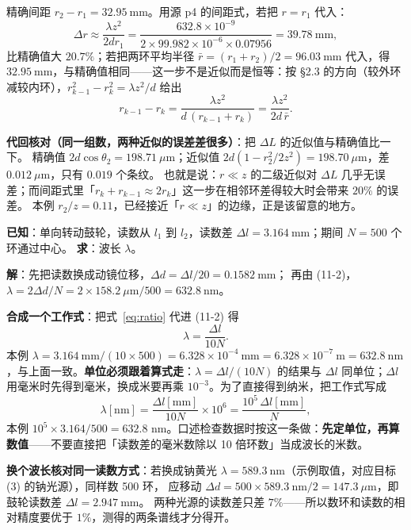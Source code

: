 \documentclass[11pt]{ctexart}
\newcommand{\Dl}{d}
\begin{document}
精确间距 $r_2-r_1=32.95\ \mathrm{mm}$。用源 p4 的间距式，若把 $r=r_1$ 代入：
\[
  \Delta r\approx\frac{\lambda z^2}{2\Dl r_1}=\frac{632.8\times10^{-9}}{2\times99.982\times10^{-6}\times0.07956}=39.78\ \mathrm{mm},
\]
比精确值大 $20.7\%$；若把两环平均半径 $\bar r=(r_1+r_2)/2=96.03\ \mathrm{mm}$ 代入，得 $32.95\ \mathrm{mm}$，与精确值相同——这一步不是近似而是恒等：按 §2.3 的方向（较外环减较内环），$r_{k-1}^2-r_k^2=\lambda z^2/\Dl$ 给出
\[
  r_{k-1}-r_k=\frac{\lambda z^2}{\Dl\,(r_{k-1}+r_k)}=\frac{\lambda z^2}{2\Dl\,\bar r}.
\]

\textbf{代回核对（同一组数，两种近似的误差差很多）}：把 $\Delta L$ 的近似值与精确值比一下。
精确值 $2\Dl\cos\theta_2=198.71\ \mu\mathrm{m}$；近似值 $2\Dl(1-r_2^2/2z^2)=198.70\ \mu\mathrm{m}$，差 $0.012\ \mu\mathrm{m}$，只有 $0.019$ 个条纹。
也就是说：$r\ll z$ 的二级近似对 $\Delta L$ 几乎无误差；而间距式里「$r_k+r_{k-1}\approx2r_k$」这一步在相邻环差得较大时会带来 $20\%$ 的误差。
本例 $r_2/z=0.11$，已经接近「$r\ll z$」的边缘，正是该留意的地方。


\textbf{已知}：单向转动鼓轮，读数从 $l_1$ 到 $l_2$，读数差 $\Delta l=3.164\ \mathrm{mm}$；期间 $N=500$ 个环通过中心。
\textbf{求}：波长 $\lambda$。

\textbf{解}：先把读数换成动镜位移，$\Delta\Dl=\Delta l/20=0.1582\ \mathrm{mm}$；
再由 (11-2)，$\lambda=2\Delta\Dl/N=2\times158.2\ \mu\mathrm{m}/500=632.8\ \mathrm{nm}$。

\textbf{合成一个工作式}：把式~\eqref{eq:ratio} 代进 (11-2) 得
\[
  \lambda=\frac{\Delta l}{10N}.
\]
本例 $\lambda=3.164\ \mathrm{mm}/(10\times500)=6.328\times10^{-4}\ \mathrm{mm}=6.328\times10^{-7}\ \mathrm{m}=632.8\ \mathrm{nm}$，与上面一致。\textbf{单位必须跟着算式走}：$\lambda=\Delta l/(10N)$ 的结果与 $\Delta l$ 同单位；$\Delta l$ 用毫米时先得到毫米，换成米要再乘 $10^{-3}$。为了直接得到纳米，把工作式写成
\[
  \lambda[\mathrm{nm}]=\frac{\Delta l[\mathrm{mm}]}{10N}\times10^{6}
  =\frac{10^{5}\,\Delta l[\mathrm{mm}]}{N},
\]
本例 $10^{5}\times3.164/500=632.8$ nm。口述检查数据时按这一条做：\textbf{先定单位，再算数值}——不要直接把「读数差的毫米数除以 10 倍环数」当成波长的米数。

\textbf{换个波长核对同一读数方式}：若换成钠黄光 $\lambda=589.3\ \mathrm{nm}$（示例取值，对应目标 (3) 的钠光源），同样数 500 环，
应移动 $\Delta\Dl=500\times589.3\ \mathrm{nm}/2=147.3\ \mu\mathrm{m}$，即鼓轮读数差 $\Delta l=2.947\ \mathrm{mm}$。
两种光源的读数差只差 $7\%$——所以数环和读数的相对精度要优于 $1\%$，测得的两条谱线才分得开。
\end{document}
